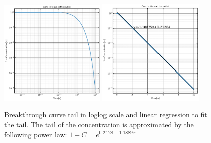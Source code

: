 \documentclass{article}
\begin{document}
\begin{figure}[htbp!]
    \centering
    \includegraphics[width=0.45\textwidth]{images/fromOpenPNM/loglogBTC.png}
    \hspace{0.05\textwidth}
    \includegraphics[width=0.45\textwidth]{images/fromOpenPNM/interpSemiLogTail.png}
    \caption{Breakthrough curve tail in loglog scale and linear regression to fit the tail. The tail of the concentration is approximated by the following power law: $1-C=e^{0.2128-1.1889x}$}
    \label{fig:LinInterpLogTail}
\end{figure}

\FloatBarrier  %
\end{document}

